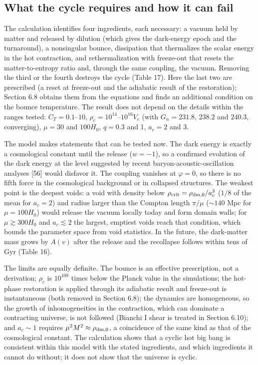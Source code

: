 \documentclass[11pt,a4paper]{article}
\begin{document}
\subsection{What the cycle requires and how it can fail}
The calculation identifies four ingredients, each necessary: a vacuum held by matter and released by dilution (which gives the dark-energy epoch and the turnaround), a nonsingular bounce, dissipation that thermalizes the scalar energy in the hot contraction, and rethermalization with freeze-out that resets the matter-to-entropy ratio and, through the same coupling, the vacuum. Removing the third or the fourth destroys the cycle (Table 17). Here the last two are prescribed (a reset at freeze-out and the adiabatic result of the restoration); Section 6.8 obtains them from the equations and finds an additional condition on the bounce temperature. The result does not depend on the details within the ranges tested: $C_T=0.1$--$10$, $\rho_c=10^{14}$--$10^{16}V_c$ (with $G_n=231.8$, $238.2$ and $240.3$, converging), $\mu=30$ and $100H_0$, $q=0.3$ and 1, $a_c=2$ and 3.

The model makes statements that can be tested now. The dark energy is exactly a cosmological constant until the release ($w=-1$), so a confirmed evolution of the dark energy at the level suggested by recent baryon-acoustic-oscillation analyses [56] would disfavor it. The coupling vanishes at $\varphi=0$, so there is no fifth force in the cosmological background or in collapsed structures. The weakest point is the deepest voids: a void with density below $\rho_{\rm crit}=\rho_{\rm dm,0}/a_c^3$ ($1/8$ of the mean for $a_c=2$) and radius larger than the Compton length $\pi/\mu$ ($\sim140$ Mpc for $\mu=100H_0$) would release the vacuum locally today and form domain walls; for $\mu\gtrsim300H_0$ and $a_c\lesssim2$ the largest, emptiest voids reach that condition, which bounds the parameter space from void statistics. In the future, the dark-matter mass grows by $A(v)$ after the release and the recollapse follows within tens of Gyr (Table 16).

The limits are equally definite. The bounce is an effective prescription, not a derivation; $\rho_c$ is $10^{108}$ times below the Planck value in the simulations; the hot-phase restoration is applied through its adiabatic result and freeze-out is instantaneous (both removed in Section 6.8); the dynamics are homogeneous, so the growth of inhomogeneities in the contraction, which can dominate a contracting universe, is not followed (Bianchi I shear is treated in Section 6.10); and $a_c\sim1$ requires $\mu^2M^2\approx\rho_{\rm dm,0}$, a coincidence of the same kind as that of the cosmological constant. The calculation shows that a cyclic hot big bang is consistent within this model with the stated ingredients, and which ingredients it cannot do without; it does not show that the universe is cyclic.
\end{document}
